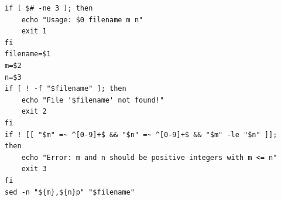 \begin{verbatim}
if [ $# -ne 3 ]; then
    echo "Usage: $0 filename m n"
    exit 1
fi
filename=$1
m=$2
n=$3
if [ ! -f "$filename" ]; then
    echo "File '$filename' not found!"
    exit 2
fi
if ! [[ "$m" =~ ^[0-9]+$ && "$n" =~ ^[0-9]+$ && "$m" -le "$n" ]]; 
then
    echo "Error: m and n should be positive integers with m <= n"
    exit 3
fi
sed -n "${m},${n}p" "$filename"
\end{verbatim}